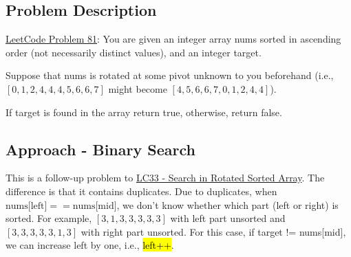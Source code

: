 \documentclass[justified]{tufte-book}
\begin{document}
\subsection{Problem Description}
\href{https://leetcode.com/problems/search-in-rotated-sorted-array-ii/}{LeetCode Problem 81}: You are given an integer array nums sorted in ascending order (not necessarily distinct values), and an integer target.

Suppose that nums is rotated at some pivot unknown to you beforehand (i.e., $[0,1,2,4,4,4,5,6,6,7]$ might become $[4,5,6,6,7,0,1,2,4,4]$).

If target is found in the array return true, otherwise, return false.

\subsection{Approach - Binary Search}
This is a follow-up problem to \hyperref[sec:lc33_search_rotated_sorted_array]{LC33 - Search in Rotated Sorted Array}. The difference is that it contains duplicates. Due to duplicates, when $\text{nums[left]} == \text{nums[mid]}$, we don't know whether which part (left or right) is sorted. For example, $[3, 1, 3, 3, 3, 3, 3]$ with left part unsorted and $[3, 3, 3, 3, 3, 1, 3]$ with right part unsorted. For this case, if target != nums[mid], we can increase left by one, i.e., \hl{left++}.   
\end{document}
